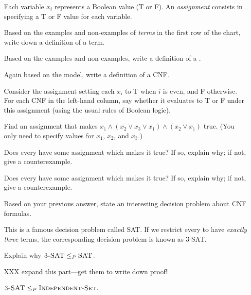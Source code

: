 \documentclass{tufte-handout}
\begin{document}
\newcommand{\true}{\textsf{T}\xspace}
\newcommand{\false}{\textsf{F}\xspace}

Each variable $x_i$ represents a Boolean value (\true or \false).  An
\emph{assignment} consists in specifying a \true or \false value for
each variable.

\begin{questions}
\item Based on the examples and non-examples of \emph{terms} in the first row
  of the chart, write down a definition of a term.
\item Based on the examples and non-examples, write a definition of
  a .
\item Again based on the model, write a definition of a
  CNF.
\item Consider the assignment setting each $x_i$ to \true when $i$ is
  even, and \false otherwise.  For each CNF in the left-hand
  column,
  say whether it evaluates to \true or \false under this assignment
  (using the usual rules of Boolean logic).
\item Find an assignment that makes $x_1 \land (\overline{x_2} \lor
  \overline{x_3} \lor \overline{x_1}) \land (x_2 \lor \overline{x_1})$
  true. (You only need to specify values for $x_1$, $x_2$, and $x_3$.)
\item Does every  have some assignment which makes it
  true?  If so, explain why; if not, give a counterexample.
\item Does every  have some assignment which makes it
  true?  If so, explain why; if not, give a counterexample.
\item Based on your previous answer, state an interesting decision
  problem about CNF formulas.
\end{questions}

This is a famous decision problem called \textsc{SAT}.  If we restrict
every  to have \emph{exactly three} terms, the
corresponding decision problem is known as \textsc{3-SAT}.

\begin{questions}
\item Explain why $\textsc{3-SAT} \leq_P \textsc{SAT}$.
\end{questions}

XXX expand this part---get them to write down proof!

\begin{thm}
  $\textsc{3-SAT} \leq_P \textsc{Independent-Set}$.
\end{thm}
\end{document}
